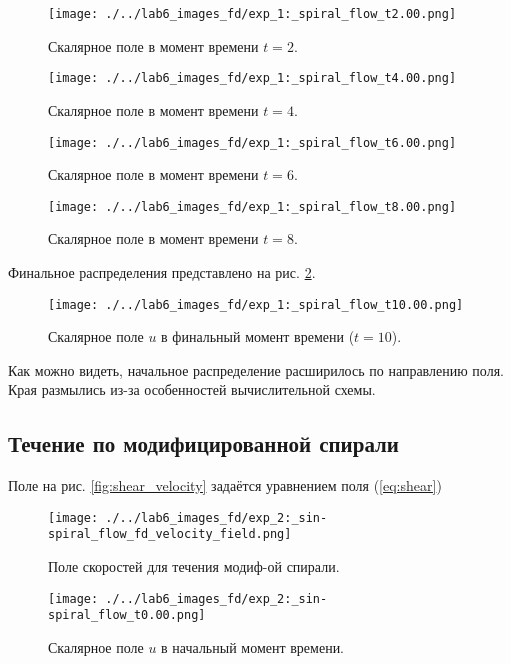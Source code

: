 \begin{figure}
	\centering
	\begin{minipage}[b]{0.48\textwidth}
		\centering
		\texttt{[image: ./../lab6\_images\_fd/exp\_1:\_spiral\_flow\_t2.00.png]}
		\caption{Скалярное поле в момент времени $t=2$.}
		\label{fig:exp_1_t2}
	\end{minipage}
	\hfill
	\begin{minipage}[b]{0.48\textwidth}
		\centering
		\texttt{[image: ./../lab6\_images\_fd/exp\_1:\_spiral\_flow\_t4.00.png]}
		\caption{Скалярное поле в момент времени $t=4$.}
	\end{minipage}
	\vspace{0.5cm}
	
	\begin{minipage}[b]{0.48\textwidth}
		\centering
		\texttt{[image: ./../lab6\_images\_fd/exp\_1:\_spiral\_flow\_t6.00.png]}
		\caption{Скалярное поле в момент времени $t=6$.}
	\end{minipage}
	\hfill
	\begin{minipage}[b]{0.48\textwidth}
		\centering
		\texttt{[image: ./../lab6\_images\_fd/exp\_1:\_spiral\_flow\_t8.00.png]}
		\caption{Скалярное поле в момент времени $t=8$.}
		\label{fig:exp_1_t8}
	\end{minipage}
\end{figure}
\newpage
Финальное распределения  представлено на рис. \ref{fig:vortex_final}.

\begin{figure}[H]
	\centering
	\texttt{[image: ./../lab6\_images\_fd/exp\_1:\_spiral\_flow\_t10.00.png]}
	\caption{Скалярное поле \(u\) в финальный момент времени ($t=10$).}
	\label{fig:vortex_final}
\end{figure}

Как можно видеть, начальное распределение расширилось по направлению поля. Края размылись из-за особенностей вычислительной схемы.
\newpage
\subsection{Течение по модифицированной спирали}
Поле на рис. \ref{fig:shear_velocity} задаётся уравнением поля (\ref{eq:shear})
\begin{figure}
	\centering
	\begin{minipage}[b]{0.48\textwidth}
		\centering
	\texttt{[image: ./../lab6\_images\_fd/exp\_2:\_sin-spiral\_flow\_fd\_velocity\_field.png]}
	\caption{Поле скоростей для течения модиф-ой спирали.}
	\label{fig:shear_velocity}
	\end{minipage}
	\hfill
	\begin{minipage}[b]{0.48\textwidth}
		\centering
	\texttt{[image: ./../lab6\_images\_fd/exp\_2:\_sin-spiral\_flow\_t0.00.png]}
	\caption{Скалярное поле \(u\) в начальный момент времени.}
	\label{fig:shear_begin}
	\end{minipage}
\end{figure}

